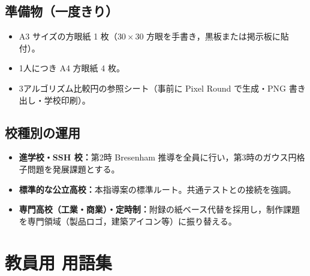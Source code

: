 \documentclass[12pt,a4paper]{scrartcl}
\begin{document}
\subsection{準備物（一度きり）}
\begin{itemize}[leftmargin=1.3em,itemsep=0.1em,topsep=0.2em,nosep]
  \item A3 サイズの方眼紙 1 枚（$30 \times 30$ 方眼を手書き，黒板または掲示板に貼付）。
  \item 1人につき A4 方眼紙 4 枚。
  \item 3アルゴリズム比較円の参照シート（事前に Pixel Round で生成・PNG 書き出し・学校印刷）。
\end{itemize}

\subsection{校種別の運用}

\begin{itemize}[leftmargin=1.3em,itemsep=0.15em,topsep=0.3em]
  \item \textbf{進学校・SSH 校：}第2時 Bresenham 推導を全員に行い，第3時のガウス円格子問題を発展課題とする。
  \item \textbf{標準的な公立高校：}本指導案の標準ルート。共通テストとの接続を強調。
  \item \textbf{専門高校（工業・商業）・定時制：}附録の紙ベース代替を採用し，制作課題を専門領域（製品ロゴ，建築アイコン等）に振り替える。
\end{itemize}

\newpage
\section{教員用 用語集}\label{ap:glos}
\end{document}
